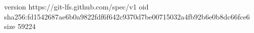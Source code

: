 version https://git-lfs.github.com/spec/v1
oid sha256:fd1542687ae6b0a9822fdf6f642c9370d7be00715032a4fb92b6e0b8dc66fce6
size 59224
